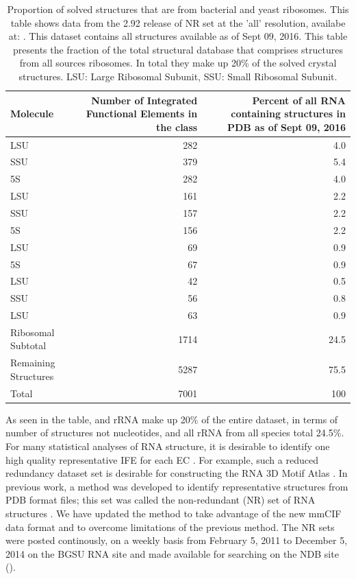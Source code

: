 \begin{table}
  \begin{tabulary}{\linewidth}{LRR}
    \toprule
    Molecule &
      Number of Integrated Functional Elements in the class &
      Percent of all RNA containing structures in PDB as of Sept 09, 2016 \\
    \midrule
    \TT{} LSU            & 282  & 4.0  \\
    \TT{} SSU            & 379  & 5.4  \\
    \TT{} 5S             & 282  & 4.0  \\
    \EC{} LSU            & 161  & 2.2  \\
    \EC{} SSU            & 157  & 2.2  \\
    \EC{} 5S             & 156  & 2.2  \\
    \HM{} LSU            & 69   & 0.9  \\
    \HM{} 5S             & 67   & 0.9  \\
    \DR{} LSU            & 42   & 0.5  \\
    \SC{} SSU            & 56   & 0.8  \\
    \SC{} LSU            & 63   & 0.9  \\
    Ribosomal Subtotal   & 1714 & 24.5 \\
    Remaining Structures & 5287 & 75.5 \\
    Total                & 7001 & 100  \\
    \bottomrule
  \end{tabulary}
  \caption{Proportion of solved structures that are from bacterial and yeast
    ribosomes. This table shows data from the 2.92 release of NR set at the
    'all' resolution, availabe at:
    . This dataset contains
    all structures available as of Sept 09, 2016. This table presents the
    fraction of the total structural database that comprises structures from all
    sources ribosomes. In total they make up 20\% of the solved crystal
  structures. LSU: Large Ribosomal Subunit, SSU: Small Ribosomal Subunit.}
  \label{tab:mol-dist}
\end{table}

As seen in the table, \EC{} and \TT{} rRNA make up 20\% of the entire dataset,
in terms of number of structures not nucleotides, and all rRNA from all species
total 24.5\%. For many statistical analyses of RNA structure, it is desirable to
identify one high quality representative IFE for each EC \cite{Leontis2012b}.
For example, such a reduced redundancy dataset set is desirable for constructing
the RNA 3D Motif Atlas \cite{Petrov2013}. In previous work, a method was
developed to identify representative structures from PDB format files; this set
was called the non-redundant (NR) set of RNA structures \cite{Leontis2012b}. We
have updated the method to take advantage of the new mmCIF data format and to
overcome limitations of the previous method. The NR sets were posted
continously, on a weekly basis from February 5, 2011 to December 5, 2014 on the
BGSU RNA site and made available for searching on the NDB site
().

